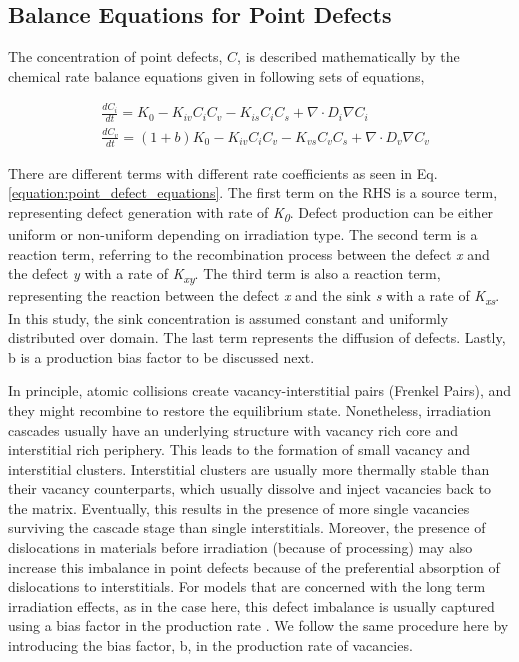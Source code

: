 \documentclass[utf8]{frontiersSCNS} %
\begin{document}

\subsection{Balance Equations for Point Defects}
 The concentration of point defects, $C$, is described mathematically by the chemical rate balance equations given in following sets of equations,

\begin{equation}
  \begin{aligned}
    &\frac{dC_i}{dt} = K_0 - K_{iv}C_iC_v - K_{is}C_iC_s + \nabla\cdot D_i\nabla C_i\\
    &\frac{dC_v}{dt} = (1+b)K_0 - K_{iv}C_iC_v - K_{vs}C_vC_s + \nabla\cdot D_v\nabla C_v
  \end{aligned}
  \label{equation:point_defect_equations}
\end{equation}

    There are different terms with different rate coefficients as seen in Eq. \ref{equation:point_defect_equations}. The first term on the RHS is a source term, representing defect generation with rate of \textit{K\textsubscript{0}}. Defect production can be either uniform or non-uniform depending on irradiation type. The second term is a reaction term, referring to the recombination process between the defect \textit{x} and the defect \textit{y} with a rate of \textit{K\textsubscript{xy}}. The third term is also a reaction term, representing the reaction between the defect \textit{x} and the sink \textit{s} with a rate of \textit{K\textsubscript{xs}}. In this study, the sink concentration is assumed constant and uniformly distributed over domain. The last term represents the  diffusion of defects\citep{motta2017,was2017}. Lastly, b is a production bias factor to be discussed next.
    
    In principle, atomic collisions create vacancy-interstitial pairs (Frenkel Pairs), and they might recombine to restore the equilibrium state. Nonetheless, irradiation cascades usually have an underlying structure with vacancy rich core and interstitial rich periphery. This leads to the formation of small vacancy and interstitial clusters. Interstitial clusters are usually more thermally stable than their vacancy counterparts, which usually dissolve and inject vacancies back to the matrix. Eventually, this results in the presence of more single vacancies surviving the cascade stage than single interstitials. Moreover, the presence of dislocations in materials before irradiation (because of processing) may also increase this imbalance in point defects because of the preferential absorption of dislocations to interstitials. For models that are concerned with the long term irradiation effects, as in the case here, this defect imbalance is usually captured using a bias factor in the production rate \citep{motta2017,was2017}. We follow the same procedure here by introducing the bias factor, b, in the production rate of vacancies.
    
\end{document}

